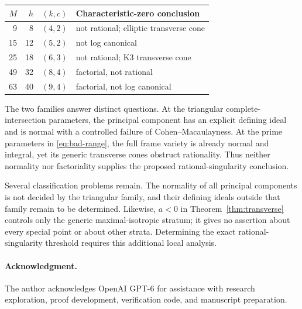 \documentclass[11pt]{article}
\theoremstyle{definition}
\theoremstyle{remark}
\numberwithin{equation}{section}
\begin{document}
\begin{center}
\begin{tabular}{@{}r r c l@{}}
\toprule
$M$&$h$&$(k,c)$&Characteristic-zero conclusion\\
\midrule
9&8&$(4,2)$&not rational; elliptic transverse cone\\
15&12&$(5,2)$&not log canonical\\
25&18&$(6,3)$&not rational; K3 transverse cone\\
49&32&$(8,4)$&factorial, not rational\\
63&40&$(9,4)$&factorial, not log canonical\\
\bottomrule
\end{tabular}
\end{center}

The two families answer distinct questions. At the triangular
complete-intersection parameters, the principal component has an
explicit defining ideal and is normal with a controlled failure of
Cohen--Macaulayness. At the prime parameters in
\eqref{eq:bad-range}, the full frame variety is already normal and
integral, yet its generic transverse cones obstruct rationality.
Thus neither normality nor factoriality supplies the proposed
rational-singularity conclusion.

Several classification problems remain. The normality of all principal
components is not decided by the triangular family, and their defining
ideals outside that family remain to be determined. Likewise,
$a<0$ in Theorem~\ref{thm:transverse} controls only the generic
maximal-isotropic stratum; it gives no assertion about every special
point or about other strata. Determining the exact rational-singularity
threshold requires this additional local analysis.

\paragraph{Acknowledgment.}
The author acknowledges OpenAI GPT-6 for assistance with research
exploration, proof development, verification code, and manuscript
preparation.
\end{document}
